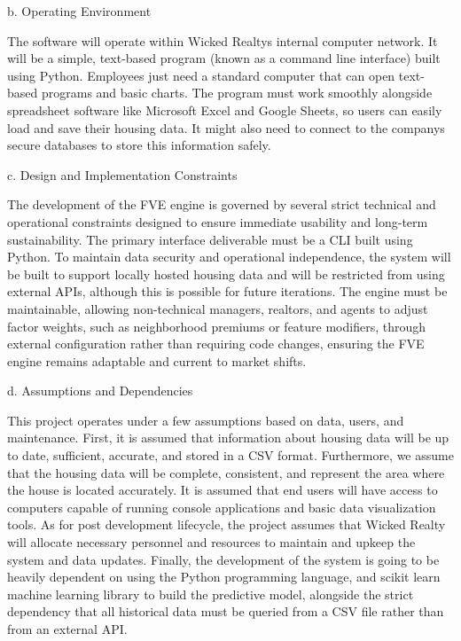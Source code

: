 \documentclass[
]{article}
\begin{document}
b. Operating Environment

The software will operate within Wicked Realty\textquotesingle s
internal computer network. It will be a simple, text-based program
(known as a command line interface) built using Python. Employees just
need a standard computer that can open text-based programs and basic
charts. The program must work smoothly alongside spreadsheet software
like Microsoft Excel and Google Sheets, so users can easily load and
save their housing data. It might also need to connect to the
company\textquotesingle s secure databases to store this information
safely.

c. Design and Implementation Constraints

The development of the FVE engine is governed by several strict
technical and operational constraints designed to ensure immediate
usability and long-term sustainability. The primary interface
deliverable must be a CLI built using Python. To maintain data security
and operational independence, the system will be built to support
locally hosted housing data and will be restricted from using external
APIs, although this is possible for future iterations. The engine must
be maintainable, allowing non-technical managers, realtors, and agents
to adjust factor weights, such as neighborhood premiums or feature
modifiers, through external configuration rather than requiring code
changes, ensuring the FVE engine remains adaptable and current to market
shifts.

d. Assumptions and Dependencies

This project operates under a few assumptions based on data, users, and
maintenance. First, it is assumed that information about housing data
will be up to date, sufficient, accurate, and stored in a CSV format.
Furthermore, we assume that the housing data will be complete,
consistent, and represent the area where the house is located
accurately. It is assumed that end users will have access to computers
capable of running console applications and basic data visualization
tools. As for post development lifecycle, the project assumes that
Wicked Realty will allocate necessary personnel and resources to
maintain and upkeep the system and data updates. Finally, the
development of the system is going to be heavily dependent on using the
Python programming language, and scikit learn machine learning library
to build the predictive model, alongside the strict dependency that all
historical data must be queried from a CSV file rather than from an
external API.
\end{document}

